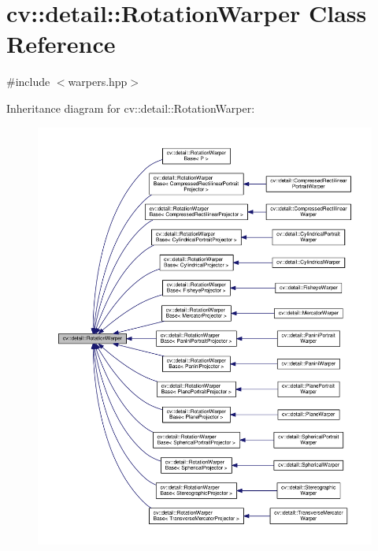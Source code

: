 \hypertarget{classcv_1_1detail_1_1RotationWarper}{\section{cv\-:\-:detail\-:\-:Rotation\-Warper Class Reference}
\label{classcv_1_1detail_1_1RotationWarper}
}


{\ttfamily \#include $<$warpers.\-hpp$>$}



Inheritance diagram for cv\-:\-:detail\-:\-:Rotation\-Warper\-:\nopagebreak
\begin{figure}[H]
\begin{center}
\leavevmode
\includegraphics[width=350pt]{classcv_1_1detail_1_1RotationWarper__inherit__graph}
\end{center}
\end{figure}
